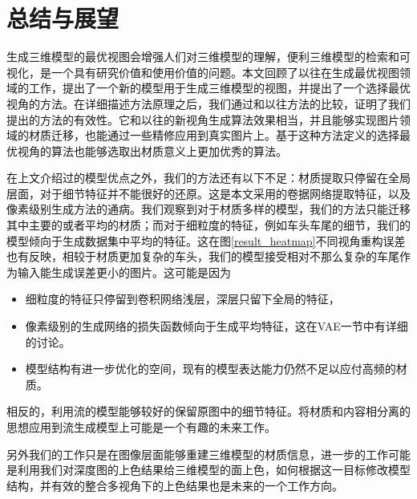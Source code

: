 \documentclass[UTF8,openany,AutoFakeBold,AutoFakeSlant,cs4size]{ctexbook}
\begin{document}
\clearpage

\chapter{总结与展望}

生成三维模型的最优视图会增强人们对三维模型的理解，便利三维模型的检索和可视化，是一个具有研究价值和使用价值的问题。本文回顾了以往在生成最优视图领域的工作，提出了一个新的模型用于生成三维模型的视图，并提出了一个选择最优视角的方法。在详细描述方法原理之后，我们通过和以往方法的比较，证明了我们提出的方法的有效性。它和以往的新视角生成算法效果相当，并且能够实现图片领域的材质迁移，也能通过一些精修应用到真实图片上。基于这种方法定义的选择最优视角的算法也能够选取出材质意义上更加优秀的算法。

在上文介绍过的模型优点之外，我们的方法还有以下不足：材质提取只停留在全局层面，对于细节特征并不能很好的还原。这是本文采用的卷据网络提取特征，以及像素级别生成方法的通病。我们观察到对于材质多样的模型，我们的方法只能迁移其中主要的或者平均的材质；而对于细粒度的特征，例如车头车尾的细节，我们的模型倾向于生成数据集中平均的特征。这在图\ref{result_heatmap}不同视角重构误差也有反映，相较于材质更加复杂的车头，我们的模型接受相对不那么复杂的车尾作为输入能生成误差更小的图片。这可能是因为
\begin{itemize}
	\item 细粒度的特征只停留到卷积网络浅层，深层只留下全局的特征，
	\item 像素级别的生成网络的损失函数倾向于生成平均特征，这在VAE一节中有详细的讨论。
	\item 模型结构有进一步优化的空间，现有的模型表达能力仍然不足以应付高频的材质。
\end{itemize}
相反的，利用流的模型能够较好的保留原图中的细节特征。将材质和内容相分离的思想应用到流生成模型上可能是一个有趣的未来工作。

另外我们的工作只是在图像层面能够重建三维模型的材质信息，进一步的工作可能是利用我们对深度图的上色结果给三维模型的面上色，如何根据这一目标修改模型结构，并有效的整合多视角下的上色结果也是未来的一个工作方向。





\clearpage


{
	\fancyhf{}
	\fancyfoot[CO,CE]{~\thepage~}
	\renewcommand{\headrulewidth}{0.7pt}
	\renewcommand{\footrulewidth}{0pt}
}
\fancyhf{}
\fancyfoot[CO,CE]{~\thepage~}
\renewcommand{\headrulewidth}{0.7pt}
\renewcommand{\footrulewidth}{0pt}
\end{document}
